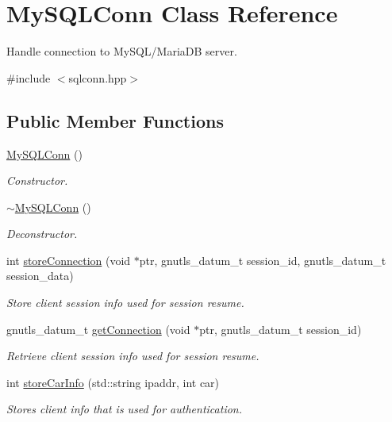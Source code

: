 \hypertarget{classMySQLConn}{\section{My\-S\-Q\-L\-Conn Class Reference}
\label{classMySQLConn}
}


Handle connection to My\-S\-Q\-L/\-Maria\-D\-B server.  




{\ttfamily \#include $<$sqlconn.\-hpp$>$}

\subsection*{Public Member Functions}
\begin{DoxyCompactItemize}
\item 
\hyperlink{classMySQLConn_aa2995f013e14fbb9c195b6aa7226588b}{My\-S\-Q\-L\-Conn} ()
\begin{DoxyCompactList}\small\item\em Constructor. \end{DoxyCompactList}\item 
\hyperlink{classMySQLConn_a1a78abd249f89676dd3ae9cffe121ba0}{$\sim$\-My\-S\-Q\-L\-Conn} ()
\begin{DoxyCompactList}\small\item\em Deconstructor. \end{DoxyCompactList}\item 
int \hyperlink{classMySQLConn_acf71076f26a8e4c72c8d6d8376d6b3ff}{store\-Connection} (void $\ast$ptr, gnutls\-\_\-datum\-\_\-t session\-\_\-id, gnutls\-\_\-datum\-\_\-t session\-\_\-data)
\begin{DoxyCompactList}\small\item\em Store client session info used for session resume. \end{DoxyCompactList}\item 
gnutls\-\_\-datum\-\_\-t \hyperlink{classMySQLConn_a0e7b657d78b0ab3199519546c8acae49}{get\-Connection} (void $\ast$ptr, gnutls\-\_\-datum\-\_\-t session\-\_\-id)
\begin{DoxyCompactList}\small\item\em Retrieve client session info used for session resume. \end{DoxyCompactList}\item 
int \hyperlink{classMySQLConn_a081f010ada91cd0d0f67ab8dddb5d8af}{store\-Car\-Info} (std\-::string ipaddr, int car)
\begin{DoxyCompactList}\small\item\em Stores client info that is used for authentication. \end{DoxyCompactList}\item 

\end{DoxyCompactItemize}
